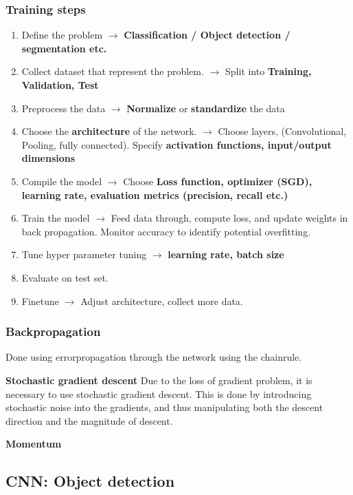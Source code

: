 \documentclass[a4paper]{article}
\begin{document}
\subsubsection*{Training steps}
\begin{enumerate}
	\item Define the problem $ \rightarrow $ \textbf{Classification / Object detection / segmentation etc.}  
	\item Collect dataset that represent the problem. $ \rightarrow $  Split into \textbf{Training, Validation, Test} 
	\item Preprocess the data $ \rightarrow $ \textbf{Normalize} or \textbf{standardize} the data  
	\item Choose the \textbf{architecture} of the network. $ \rightarrow $ Choose layers, (Convolutional, Pooling, fully connected). Specify \textbf{activation functions, input/output dimensions} 
	\item Compile the model $ \rightarrow $ Choose \textbf{Loss function, optimizer (SGD), learning rate, evaluation metrics (precision, recall etc.)}  
	\item Train the model $ \rightarrow $ Feed data through, compute loss, and update weights in back propagation. Monitor accuracy to identify potential overfitting.
	\item Tune hyper parameter tuning $ \rightarrow $ \textbf{learning rate, batch size} 
	\item Evaluate on test set.
	\item Finetune $ \rightarrow $ Adjust architecture, collect more data.
\end{enumerate}




\subsubsection*{Backpropagation}
Done using errorpropagation through the network using the chainrule. 

\textbf{Stochastic gradient descent} 
Due to the loss of gradient problem, it is necessary to use stochastic gradient descent. This is done by introducing stochastic noise into the gradients, and thus manipulating both the descent direction and the magnitude of descent.

\textbf{Momentum} 


\newpage
\subsection{CNN: Object detection}
\end{document}
